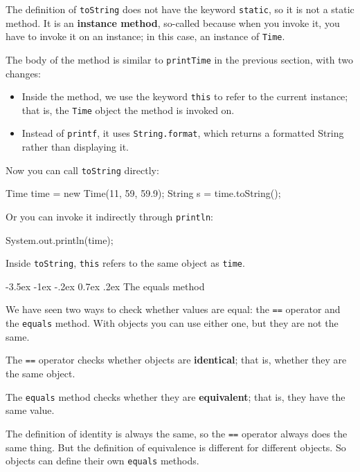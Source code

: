 \documentclass[12pt]{book}
\makeatletter
\theoremstyle{exercise}
\newcommand{\java}[1]{\verb"#1"}
\renewcommand{\section}{\@startsection{section}{1}{\z@}%
    {-3.5ex \@plus -1ex \@minus -.2ex}%
    {0.7ex \@plus.2ex}%
    {\normalfont\Large\bfseries}}
\newcommand{\java}[1]{\lstinline{#1}} %
\makeatother
\begin{document}
The definition of \java{toString} does not have the keyword \java{static}, so it is not a static method.
It is an {\bf instance method}, so-called because when you invoke it, you have to invoke it on an instance; in this case, an instance of \java{Time}.

The body of the method is similar to \java{printTime} in the previous section, with two changes:

\begin{itemize}

\item Inside the method, we use the keyword \java{this} to refer to the current instance; that is, the \java{Time} object the method is invoked on.

\item Instead of \java{printf}, it uses \java{String.format}, which returns a formatted String rather than displaying it.

\end{itemize}

Now you can call \java{toString} directly:

\begin{code}
    Time time = new Time(11, 59, 59.9);
    String s = time.toString();
\end{code}

Or you can invoke it indirectly through \java{println}:

\begin{code}
    System.out.println(time);
\end{code}

Inside \java{toString}, \java{this} refers to the same object as \java{time}.


\section{The equals method}
\label{equals}

We have seen two ways to check whether values are equal: the \java{==} operator and the \java{equals} method.
With objects you can use either one, but they are not the same.

The \java{==} operator checks whether objects are {\bf identical}; that is, whether they are the same object.

The \java{equals} method checks whether they are {\bf equivalent}; that is, they have the same value.

The definition of identity is always the same, so the \java{==} operator always does the same thing.
But the definition of equivalence is different for different objects.
So objects can define their own \java{equals} methods.
\end{document}
